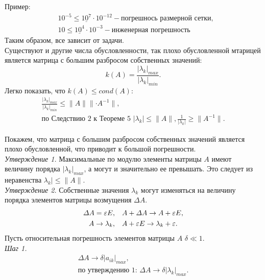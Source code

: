 \documentclass[a4paper,11pt]{article}
\begin{document}
Пример: \\
\begin{align*}
  &10^{-5} \le \underline{10^7} \cdot 10^{-12} - \text{погрешнось размерной сетки}, \\
  &10 \le \underline{10^4} \cdot 10^{-3} - \text{инженерная погрешность}
\end{align*}
Таким образом, все зависит от задачи.\\

Существуют и другие числа обусловленности, так плохо обусловленной мтарицей является матрица с большим разбросом собственных значений:
\begin{equation*}
  k(A) = \frac{|\lambda_k|_{max}}{|\lambda_k|_{min}}.
\end{equation*}
Легко показать, что $k(A) \le cond(A)$:
\begin{gather*}
  \frac{|\lambda_k|_{max}}{|\lambda_k|_{min}} \le \parallel A\parallel \parallel \cdot A^{-1}\parallel, \\
  \text{по Следствию 2 к Теореме 5 } |\lambda_k| \le \parallel A\parallel, \frac{1}{|\lambda_k|} \ge \parallel A^{-1}\parallel.
\end{gather*}

Покажем, что матрица с большим разбросом собственных значений является плохо обусловленной, что приводит к большой погрешности.\\

\noindent \textit{Утверждение 1.} Максимальные по модулю элементы матрицы $A$ имеют величину порядка $|\lambda_k|_{max}$, а могут и значительно ее превышать.
Это следует из неравенства $\lambda_k| \le \parallel A\parallel$. \\

\noindent \textit{Утверждение 2.} Собственные значения $\lambda_k$ могут изменяться на величину порядка элементов матрицы возмущения $\varDelta A$.
\begin{gather*}
  \varDelta A = \varepsilon E, \hspace{3mm} A+\varDelta A \rightarrow A+\varepsilon E, \\
  A \rightarrow \lambda_k, \hspace{3mm} A+\varepsilon E \rightarrow \lambda_k+\varepsilon.
\end{gather*}
Пусть относительная погрешность элементов матрицы $A$ $\delta \ll 1$. \\

\textit{Шаг 1.}
\begin{gather*}
  \varDelta A \rightarrow \delta|a_{ik}|_{max}, \\
  \text{по утверждению 1: } \varDelta A \rightarrow \delta|\lambda_k|_{max}.
\end{gather*}
\end{document}
